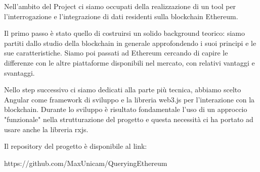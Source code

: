 \par \noindent
Nell'ambito del Project ci siamo occupati della realizzazione di un tool per l'interrogazione e l'integrazione di dati residenti sulla blockchain Ethereum.
\vspace{0.5cm}
\par \noindent
Il primo passo è stato quello di costruirsi un solido background teorico: siamo partiti dallo studio della blockchain in generale approfondendo i suoi principi e le sue caratteristiche. Siamo poi passati ad Ethereum cercando di capire le differenze con le altre piattaforme disponibili nel mercato, con relativi vantaggi e svantaggi.
\vspace{0.5cm}
\par \noindent
Nello step successivo ci siamo dedicati alla parte più tecnica, abbiamo scelto Angular come framework di sviluppo e la libreria web3.js per l'interazione con la blockchain. Durante lo sviluppo è risultato fondamentale l'uso di un approccio "funzionale" nella strutturazione del progetto e questa necessità ci ha portato ad usare anche la libreria rxjs.

\vspace{0.5cm}

\par \noindent
Il repository del progetto è disponibile al link:

https://github.com/MaxUnicam/QueryingEthereum
